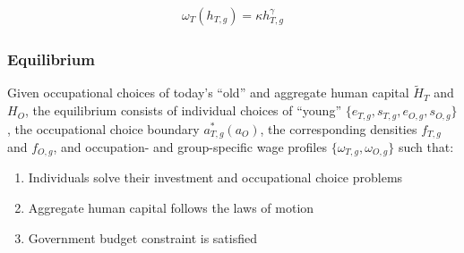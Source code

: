 \documentclass[11pt]{beamer}
\begin{document}
\begin{frame}
\begin{itemize}
				\begin{align*}
					\omega_T(h_{T,g})  =  \kappa h_{T,g}^\gamma 
	\end{align*}
\end{itemize}

\end{frame}

\begin{frame}
\frametitle{Equilibrium}
\label{eqm}
Given occupational choices of today's ``old'' and aggregate human capital $\widetilde{H}_{T}$ and ${H}_{O}$, the equilibrium consists of individual choices of ``young'' $\{e_{T,g}, s_{T,g}, e_{O,g}, s_{O,g}\}$, the occupational choice boundary $a^*_{T,g}(a_O)$, the corresponding densities $f_{T,g}$ and $f_{O,g}$, and occupation- and group-specific wage profiles $\{\omega_{T,g}, \omega_{O,g}\}$ such that:
\begin{enumerate}
	\item Individuals solve their investment and occupational choice problems \hyperlink{time_inv}{} \hyperlink{good_inv}{}
	\item Aggregate human capital follows the laws of motion \hyperlink{laws}{}
	\item Government budget constraint is satisfied
\end{enumerate}
\end{frame}
\end{document}
